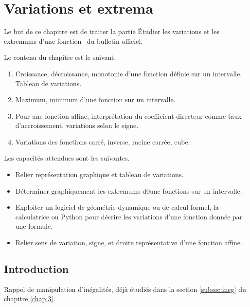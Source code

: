 
\chapter{Variations et extrema}

Le but de ce chapitre est de traiter la partie \og Étudier les variations et les extremums d'une fonction \fg~du bulletin officiel.

Le contenu du chapitre est le suivant.
	\begin{enumerate}
		\item Croissance, décroissance, monotonie d'une fonction définie sur un intervalle. Tableau de variations.
		\item Maximum, minimum d'une fonction sur un intervalle.
		\item Pour une fonction affine, interprétation du coefficient directeur comme taux d'accroissement, variations selon le signe.
		\item Variations des fonctions carré, inverse, racine carrée, cube.
	\end{enumerate}

Les capacités attendues sont les suivantes.
	\begin{itemize}
		\item Relier représentation graphique et tableau de variations.
		\item Déterminer graphiquement les extremums d0une fonctions sur un intervalle.
		\item Exploiter un logiciel de géométrie dynamique ou de calcul formel, la calculatrice ou Python pour décrire les variations d'une fonction donnée par une formule.
		\item Relier sens de variation, signe, et droite représentative d'une fonction affine.
	\end{itemize}
	
\section{Introduction}

Rappel de manipulation d'inégalités, déjà étudiés dans la section \ref{subsec:ineg} du chapitre \ref{chap:3}.


